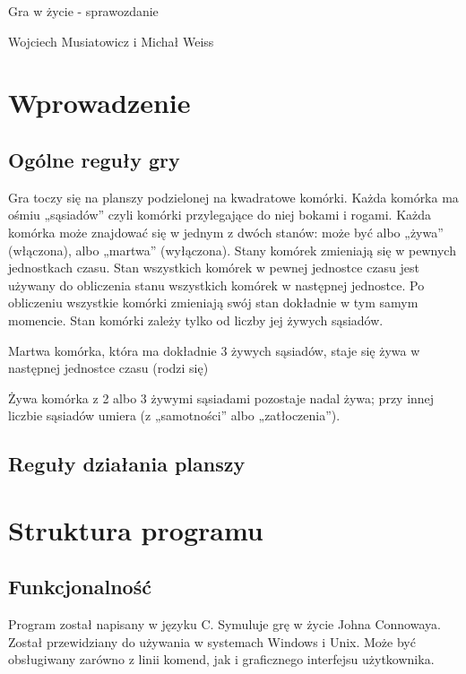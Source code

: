 \documentclass{article}
\begin{document}
\begin{Huge}
\begin{center}
Gra w życie - sprawozdanie
\end{center}
\end{Huge}
\begin{center}
{\Large Wojciech Musiatowicz i Michał Weiss}
\end{center}

\section{Wprowadzenie}
\subsection*{Ogólne reguły gry}


Gra toczy się na  planszy podzielonej na kwadratowe komórki. Każda komórka ma
ośmiu „sąsiadów” czyli komórki przylegające do niej bokami i rogami. Każda komórka może
znajdować się w jednym z dwóch stanów: może być albo „żywa” (włączona), albo „martwa”
(wyłączona). Stany komórek zmieniają się w pewnych jednostkach czasu. Stan wszystkich komórek
w pewnej jednostce czasu jest używany do obliczenia stanu wszystkich komórek w następnej
jednostce. Po obliczeniu wszystkie komórki zmieniają swój stan dokładnie w tym samym
momencie. Stan komórki zależy tylko od liczby jej żywych sąsiadów.

Martwa komórka, która ma dokładnie 3 żywych sąsiadów, staje się żywa w następnej jednostce
czasu (rodzi się)

Żywa komórka z 2 albo 3 żywymi sąsiadami pozostaje nadal żywa; przy innej liczbie sąsiadów
umiera (z „samotności” albo „zatłoczenia”).
\subsection*{Reguły działania planszy}
\section{Struktura programu}
\subsection*{Funkcjonalność}

Program został napisany w języku C. Symuluje grę w życie Johna Connowaya.  Został przewidziany do używania w systemach Windows i Unix. Może być obsługiwany zarówno z linii komend, jak i graficznego interfejsu użytkownika.
\end{document}
